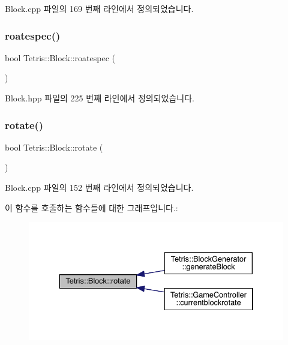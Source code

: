 Block.\+cpp 파일의 169 번째 라인에서 정의되었습니다.

\mbox{\label{class_tetris_1_1_block_a787424e5e9ec2807989121e8dcee1a7a}} 
\subsubsection{\texorpdfstring{roatespec()}{roatespec()}\hspace{0.1cm}{\footnotesize\ttfamily [2/2]}}
{\footnotesize\ttfamily bool Tetris\+::\+Block\+::roatespec (\begin{DoxyParamCaption}{ }\end{DoxyParamCaption})\hspace{0.3cm}{\ttfamily [inline]}}



Block.\+hpp 파일의 225 번째 라인에서 정의되었습니다.

\mbox{\label{class_tetris_1_1_block_a0d1eb57e6da91832ad983f7a4fa9ca04}} 
\subsubsection{\texorpdfstring{rotate()}{rotate()}\hspace{0.1cm}{\footnotesize\ttfamily [1/2]}}
{\footnotesize\ttfamily bool Tetris\+::\+Block\+::rotate (\begin{DoxyParamCaption}{ }\end{DoxyParamCaption})}



Block.\+cpp 파일의 152 번째 라인에서 정의되었습니다.

이 함수를 호출하는 함수들에 대한 그래프입니다.\+:
\nopagebreak
\begin{figure}[H]
\begin{center}
\leavevmode
\includegraphics[width=334pt]{class_tetris_1_1_block_a0d1eb57e6da91832ad983f7a4fa9ca04_icgraph}
\end{center}
\end{figure}
\mbox{\label{class_tetris_1_1_block_a0d1eb57e6da91832ad983f7a4fa9ca04}} 

